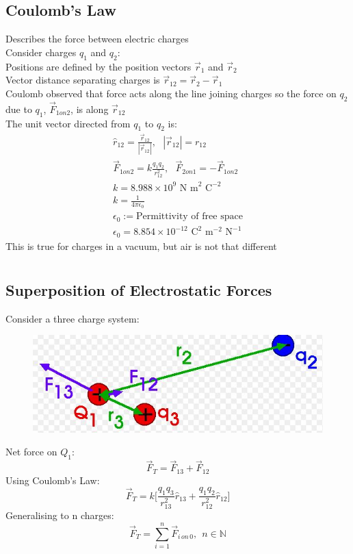 \documentclass[a4paper, 11pt, fleqn, normalem]{report}
\begin{document}
\section{Coulomb's Law}
Describes the force between electric charges \\
Consider charges $q_{1}$ and $q_{2}$: \\
Positions are defined by the position vectors $\vec{r}_{1}$ and $\vec{r}_{2}$ \\
Vector distance separating charges is $\vec{r}_{12} = \vec{r}_{2} - \vec{r}_{1}$ \\
Coulomb observed that force acts along the line joining charges so the force on $q_{2}$ due to $q_{1}$, $\vec{F}_{1on2}$, is along $\vec{r}_{12}$ \\
The unit vector directed from $q_{1}$ to $q_{2}$ is:
\begin{gather*}
    \hat{r}_{12} = \frac{\vec{r}_{12}}{|\vec{r}_{12}|},~~~|\vec{r}_{12}| = r_{12} \\
    \vec{F}_{1on2} = k\frac{q_{1}q_{2}}{r_{12}^{2}},~~~\vec{F}_{2on1} = -\vec{F}_{1on2} \\
    k = 8.988\times10^9\text{ N m}^{2}\text{ C}^{-2} \\
    k = \frac{1}{4\pi\epsilon_{0}} \\
    \epsilon_{0} := \text{Permittivity of free space} \\
    \epsilon_{0} = 8.854\times10^{-12}\text{ C}^{2}\text{ m}^{-2}\text{ N}^{-1}
\end{gather*}
This is true for charges in a vacuum, but air is not that different

\chapter{}
\section{Superposition of Electrostatic Forces}
Consider a three charge system:
\begin{figure}[H]
    \includegraphics{3Force.JPG}
\end{figure}
Net force on $Q_{1}$:
\begin{equation*}
    \vec{F}_{T} = \vec{F}_{13} + \vec{F}_{12}
\end{equation*}
Using Coulomb's Law:
\begin{equation*}
    \vec{F}_{T} = k\Big[\frac{q_{1}q_{3}}{r_{13}^{2}}\hat{r}_{13} + \frac{q_{1}q_{2}}{r_{12}^{2}}\hat{r}_{12}\Big]
\end{equation*}
Generalising to n charges:
\begin{equation*}
    \vec{F}_{T} = \sum_{i = 1}^{n} \vec{F}_{i\,on\,0},~~n \in \mathbb{N}
\end{equation*}
\end{document}
